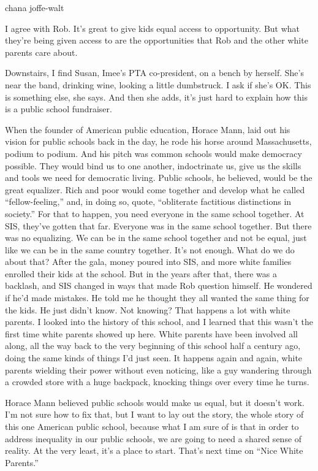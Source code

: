 chana joffe-walt

I agree with Rob. It's great to give kids equal access to opportunity.
But what they're being given access to are the opportunities that Rob
and the other white parents care about.

Downstairs, I find Susan, Imee's PTA co-president, on a bench by
herself. She's near the band, drinking wine, looking a little
dumbstruck. I ask if she's OK. This is something else, she says. And
then she adds, it's just hard to explain how this is a public school
fundraiser.

When the founder of American public education, Horace Mann, laid out his
vision for public schools back in the day, he rode his horse around
Massachusetts, podium to podium. And his pitch was common schools would
make democracy possible. They would bind us to one another, indoctrinate
us, give us the skills and tools we need for democratic living. Public
schools, he believed, would be the great equalizer. Rich and poor would
come together and develop what he called ``fellow-feeling,'' and, in
doing so, quote, ``obliterate factitious distinctions in society.'' For
that to happen, you need everyone in the same school together. At SIS,
they've gotten that far. Everyone was in the same school together. But
there was no equalizing. We can be in the same school together and not
be equal, just like we can be in the same country together. It's not
enough. What do we do about that? After the gala, money poured into SIS,
and more white families enrolled their kids at the school. But in the
years after that, there was a backlash, and SIS changed in ways that
made Rob question himself. He wondered if he'd made mistakes. He told me
he thought they all wanted the same thing for the kids. He just didn't
know. Not knowing? That happens a lot with white parents. I looked into
the history of this school, and I learned that this wasn't the first
time white parents showed up here. White parents have been involved all
along, all the way back to the very beginning of this school half a
century ago, doing the same kinds of things I'd just seen. It happens
again and again, white parents wielding their power without even
noticing, like a guy wandering through a crowded store with a huge
backpack, knocking things over every time he turns.

Horace Mann believed public schools would make us equal, but it doesn't
work. I'm not sure how to fix that, but I want to lay out the story, the
whole story of this one American public school, because what I am sure
of is that in order to address inequality in our public schools, we are
going to need a shared sense of reality. At the very least, it's a place
to start. That's next time on ``Nice White Parents.''

